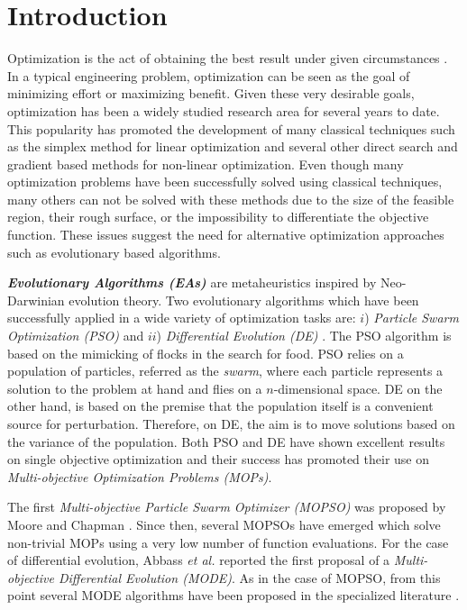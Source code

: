 \chapter{Introduction}

Optimization is the act of obtaining the best result under given circumstances \cite{Rao2009}. In a typical engineering problem, optimization can be seen as the goal of minimizing effort or maximizing benefit. Given these very desirable goals, optimization has been a widely studied research area for several years to date. This popularity has promoted the development of many classical techniques such as the simplex method for linear optimization and several other direct search and gradient based methods for non-linear optimization. Even though many optimization problems have been successfully solved using classical techniques, many others can not be solved with these methods due to the size of the feasible region, their rough surface, or the impossibility to differentiate the objective function. These issues suggest the need for alternative optimization approaches such as evolutionary based algorithms. 


\textbf{\emph{Evolutionary Algorithms (EAs)}} are metaheuristics inspired by Neo-Darwinian evolution theory. Two evolutionary algorithms which have been successfully applied in a wide variety of optimization tasks are: $i$) \emph{Particle Swarm Optimization (PSO)} \cite{Kennedy1995} and $ii$) \emph{Differential Evolution (DE)} \cite{Price1997}. The PSO algorithm is based on the mimicking of flocks in the search for food. PSO relies on a population of particles, referred as the \emph{swarm}, where each particle represents a solution to the problem at hand and flies on a $n$-dimensional space. DE on the other hand, is based on the premise that the population itself is a convenient source for perturbation. Therefore, on DE, the aim is to move solutions based on the variance of the population.  Both PSO and DE have shown excellent results on single objective optimization and their success has promoted their use on \emph{Multi-objective Optimization Problems (MOPs)}.

The first \emph{Multi-objective Particle Swarm Optimizer (MOPSO)} was proposed by Moore and Chapman \cite{Moore99}. Since then, several MOPSOs \cite{Reyes06,Toscano05,Branke06,Coello04} have emerged which solve non-trivial MOPs using a very low number of function evaluations. For the case of differential evolution, Abbass \emph{et al.} \cite{Abbass01} reported the first proposal of a \emph{Multi-objective Differential Evolution (MODE)}. As in the case of MOPSO, from this point several MODE algorithms have been proposed in the specialized literature \cite{Robic05,Santana05,Xue03}.


